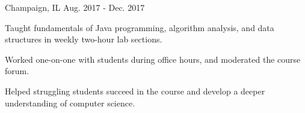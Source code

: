 \begin{cventries}
{Champaign, IL} %
{Aug. 2017 - Dec. 2017} %
{
	\begin{cvitems} %
		\item {Taught fundamentals of Java programming, algorithm analysis, and data structures in weekly two-hour lab sections.}
		\item {Worked one-on-one with students during office hours, and moderated the course forum.}
		\item {Helped struggling students succeed in the course and develop a deeper understanding of computer science.}
	\end{cvitems}
}
\end{cventries}
